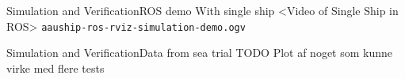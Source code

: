 \documentclass[10pt,handout]{beamer}
\begin{document}

\begin{frame}{Simulation and Verification}{ROS demo With single ship}
<Video of Single Ship in ROS>
\texttt{aauship-ros-rviz-simulation-demo.ogv}
\end{frame}

\begin{frame}{Simulation and Verification}{Data from sea trial}
TODO Plot af noget som kunne virke med flere tests  
\end{frame}


\end{document}
